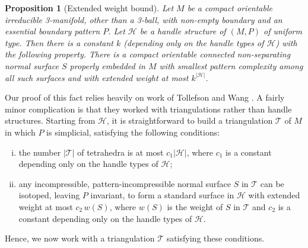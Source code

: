\documentclass[oneside]{amsart}
\numberwithin{equation}{section}
\theoremstyle{plain}
\newtheorem{proposition}[equation]{Proposition}
\theoremstyle{definition}
\begin{document}
\begin{proposition}[Extended weight bound]
\label{Prop:ExpBoundExtendedWeight}
Let $M$ be a compact orientable irreducible 3-manifold, other than a 3-ball, with non-empty boundary and
an essential boundary pattern $P$.
Let $\mathcal{H}$ be a handle structure of $(M,P)$ of uniform type. Then there is a constant $k$
(depending only on the handle types of $\mathcal{H}$) with the following property. There is 
a compact orientable connected non-separating normal surface $S$ properly embedded in $M$
with smallest pattern complexity among all such surfaces and with extended weight at most
$k^{|\mathcal H|}$.
\end{proposition}

Our proof of this fact relies heavily on work of Tollefson and Wang \cite{TollefsonWang}. A fairly minor complication
is that they worked
with triangulations rather than handle structures. Starting from $\mathcal{H}$, it is straightforward
to build a triangulation $\mathcal{T}$ of $M$ in which $P$ is simplicial, satisfying the
following conditions:
\begin{enumerate}[(i)]
\item the number $|\mathcal{T}|$ of tetrahedra is at most $c_1|\mathcal{H}|$, where $c_1$ is a constant
depending only on the handle types of $\mathcal{H}$;
\item any incompressible, pattern-incompressible normal surface $S$ in $\mathcal{T}$
can be isotoped, leaving $P$ invariant, to form a standard surface in $\mathcal{H}$ with extended weight at most $c_2 \, w(S)$,
where $w(S)$ is the weight of $S$ in $\mathcal{T}$ and $c_2$ is a constant
depending only on the handle types of $\mathcal{H}$. 
\end{enumerate}
Hence, we now work with a triangulation $\mathcal{T}$ satisfying these conditions.
\end{document}
